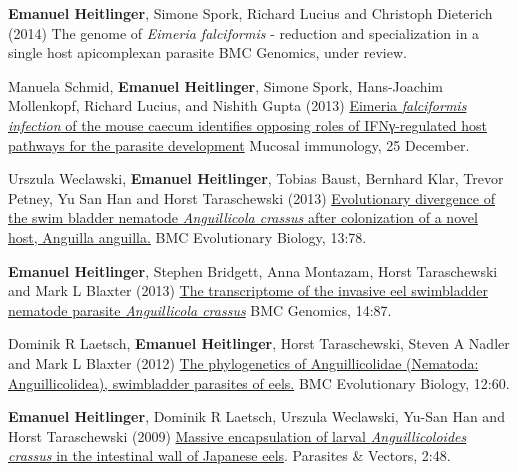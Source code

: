 \documentclass[10pt,a4paper]{article}
\renewenvironment{itemize}{
  \begin{list}{}{
    \setlength{\leftmargin}{2.5em}
    \setlength{\itemsep}{0.25em}
    \setlength{\parskip}{0pt}
    \setlength{\parsep}{0.25em}
  }
}{
  \end{list}
}
\begin{document}
\begin{itemize}


\item \textbf{Emanuel Heitlinger}, Simone Spork, Richard Lucius and Christoph
  Dieterich (2014) The genome of \textit{Eimeria falciformis} -
    reduction and specialization in a single host apicomplexan
    parasite BMC Genomics, under review.

\item Manuela Schmid, \textbf{Emanuel Heitlinger}, Simone Spork, Hans-Joachim
  Mollenkopf, Richard Lucius, and Nishith Gupta (2013)
  \href{http://www.nature.com/mi/journal/vaop/ncurrent/full/mi2013115a.html}
  {Eimeria \textit{falciformis infection} of the mouse caecum identifies
    opposing roles of IFNγ-regulated host pathways for the parasite
    development} Mucosal immunology, 25 December.

\item Urszula Weclawski, \textbf{Emanuel Heitlinger}, Tobias Baust,
  Bernhard Klar, Trevor Petney, Yu San Han and Horst Taraschewski
  (2013) 
  \href{http://www.biomedcentral.com/1471-2148/13/78}{
    Evolutionary divergence of the swim bladder nematode
    \textit{Anguillicola crassus} after colonization of a novel host,
    Anguilla anguilla.} BMC Evolutionary Biology,
  13:78.

\item \textbf{Emanuel Heitlinger}, Stephen Bridgett, Anna Montazam,
  Horst Taraschewski and Mark L Blaxter (2013)
  \href{http://www.biomedcentral.com/1471-2164/14/87}{The
    transcriptome of the invasive eel swimbladder nematode parasite
    \textit{Anguillicola crassus}} BMC Genomics, 
  14:87.

\item Dominik R Laetsch, \textbf{Emanuel Heitlinger}, Horst
  Taraschewski, Steven A Nadler and Mark L Blaxter (2012)
  \href{http://www.biomedcentral.com/1471-2148/12/60} {The
    phylogenetics of Anguillicolidae (Nematoda: Anguillicolidea),
    swimbladder parasites of eels.} BMC Evolutionary Biology,
  12:60.

\item \textbf{Emanuel Heitlinger}, Dominik R Laetsch, Urszula
  Weclawski, Yu-San Han and Horst Taraschewski (2009)
  \href{http://www.parasitesandvectors.com/content/2/1/48}{Massive
    encapsulation of larval \textit{Anguillicoloides crassus} in the
    intestinal wall of Japanese eels}. Parasites \& Vectors,
  2:48.
\end{itemize}
\end{document}
